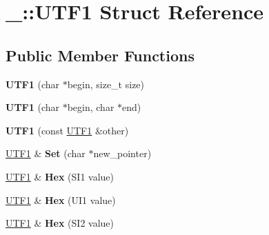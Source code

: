 \hypertarget{struct___1_1_u_t_f1}{}\section{\+\_\+\+:\+:U\+T\+F1 Struct Reference}
\label{struct___1_1_u_t_f1}
\subsection*{Public Member Functions}
\begin{DoxyCompactItemize}
\item 
\mbox{\label{struct___1_1_u_t_f1_a6877af0a99a95ba66ff31a0ea3792233}} 
{\bfseries U\+T\+F1} (char $\ast$begin, size\+\_\+t size)
\item 
\mbox{\label{struct___1_1_u_t_f1_ae51619e58bc986876998474bf2978331}} 
{\bfseries U\+T\+F1} (char $\ast$begin, char $\ast$end)
\item 
\mbox{\label{struct___1_1_u_t_f1_a047c4a4adebe9682ae51d518fafab86c}} 
{\bfseries U\+T\+F1} (const \mbox{\hyperlink{struct___1_1_u_t_f1}{U\+T\+F1}} \&other)
\item 
\mbox{\label{struct___1_1_u_t_f1_ae85362362dd9dd2128da2feb9df575ee}} 
\mbox{\hyperlink{struct___1_1_u_t_f1}{U\+T\+F1}} \& {\bfseries Set} (char $\ast$new\+\_\+pointer)
\item 
\mbox{\label{struct___1_1_u_t_f1_a02a651e0e0a1c0ba03b09050505ae746}} 
\mbox{\hyperlink{struct___1_1_u_t_f1}{U\+T\+F1}} \& {\bfseries Hex} (S\+I1 value)
\item 
\mbox{\label{struct___1_1_u_t_f1_ad49bed1a684fc41f15f7de7698147e09}} 
\mbox{\hyperlink{struct___1_1_u_t_f1}{U\+T\+F1}} \& {\bfseries Hex} (U\+I1 value)
\item 
\mbox{\label{struct___1_1_u_t_f1_aa9bf83cc9c6c70aa807cf32708ecefbe}} 
\mbox{\hyperlink{struct___1_1_u_t_f1}{U\+T\+F1}} \& {\bfseries Hex} (S\+I2 value)
\item 
\mbox{\label{struct___1_1_u_t_f1_a98cee4f7cf838f940858206cacc44240}} 

\end{DoxyCompactItemize}
